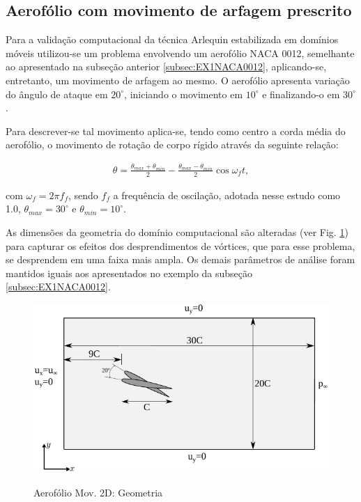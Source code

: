 \documentclass[tese_patricia]{subfiles}
\begin{document}
\subsection{Aerofólio com movimento de arfagem prescrito}


Para a validação computacional da técnica Arlequin estabilizada em domínios móveis  utilizou-se um problema envolvendo um aerofólio NACA 0012, semelhante ao apresentado na subseção anterior \ref{subsec:EX1NACA0012}, aplicando-se, entretanto, um movimento de arfagem ao mesmo. O aerofólio apresenta variação do ângulo de ataque em $20^{\circ}$, iniciando o movimento em $10^{\circ}$ e finalizando-o em $30^{\circ}$. 

Para descrever-se tal movimento aplica-se, tendo como centro a corda média do aerofólio, o movimento de rotação de corpo rígido através da seguinte relação:

\begin{align}
	\theta = \frac{\theta_{max}+\theta_{min}}{2} - \frac{\theta_{max}-\theta_{min}}{2}\cos{\omega_{f}t} ,
\end{align}

\noindent com $\omega_{f} = 2\pi f_{f}$, sendo $f_{f}$ a frequência de oscilação, adotada nesse estudo como 1.0, $\theta_{max} = 30^{\circ}$ e $\theta_{min} = 10^{\circ}$.

As dimensões da geometria do domínio computacional são alteradas (ver Fig. \ref{fig:AerofolioMoving}) para capturar os efeitos dos desprendimentos de vórtices, que para esse problema, se desprendem em uma faixa mais ampla. Os demais parâmetros de análise foram mantidos iguais aos apresentados no exemplo da subseção \ref{subsec:EX1NACA0012}. 

\begin{figure}[htb!]
	\centering 
	{\includegraphics[scale=1.0,trim=0cm 0cm 0cm 0cm, clip=true]{Imagens/Cap6/aerofolioMov.pdf}}	
	\caption{Aerofólio Mov. 2D: Geometria}
	\label{fig:AerofolioMoving}
\end{figure}
\end{document}
